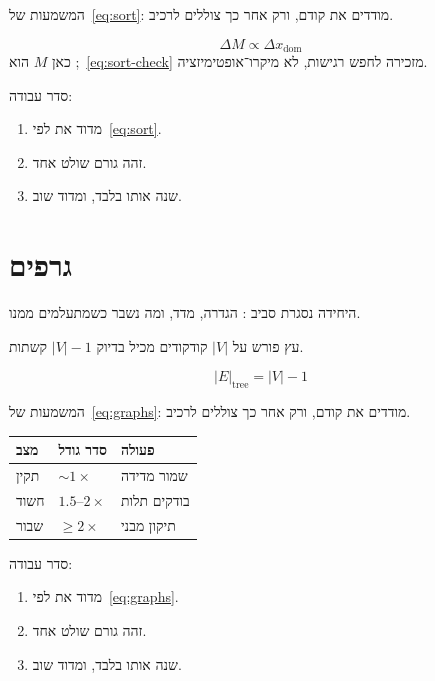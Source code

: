 המשמעות של~\eqref{eq:sort}: מודדים את  קודם, ורק אחר כך צוללים לרכיב.

\begin{equation}
\label{eq:sort-check}
\Delta M \propto \Delta x_{\mathrm{dom}}
\end{equation}
כאן $M$ הוא ;~\eqref{eq:sort-check} מזכירה לחפש רגישות, לא מיקרו־אופטימיזציה.

סדר עבודה:
\begin{enumerate}
\item[(\textbf{א})] מדוד את  לפי~\eqref{eq:sort}.
\item[(\textbf{ב})] זהה גורם שולט אחד.
\item[(\textbf{ג})] שנה אותו בלבד, ומדוד שוב.
\end{enumerate}

\chapter{גרפים}
\label{ch:graphs}

היחידה נסגרת סביב : הגדרה, מדד, ומה נשבר כשמתעלמים ממנו.

\begin{defbox}[frametitle={הגדרה — גרפים}]
עץ פורש על $|V|$ קודקודים מכיל בדיוק $|V|-1$ קשתות.
\end{defbox}

\begin{equation}
\label{eq:graphs}
|E|_{\mathrm{tree}}=|V|-1
\end{equation}

המשמעות של~\eqref{eq:graphs}: מודדים את  קודם, ורק אחר כך צוללים לרכיב.

\begin{tablebox}\centering\small
\begin{tabular}{@{}lll@{}}
\toprule
\textbf{מצב} & \textbf{סדר גודל} & \textbf{פעולה}\\
\midrule
תקין & $\sim 1\times$ & שמור מדידה\\
חשוד & $1.5$–$2\times$ & בודקים תלות\\
שבור & $\ge 2\times$ & תיקון מבני\\
\bottomrule
\end{tabular}
\end{tablebox}

סדר עבודה:
\begin{enumerate}
\item[(\textbf{א})] מדוד את  לפי~\eqref{eq:graphs}.
\item[(\textbf{ב})] זהה גורם שולט אחד.
\item[(\textbf{ג})] שנה אותו בלבד, ומדוד שוב.
\end{enumerate}

